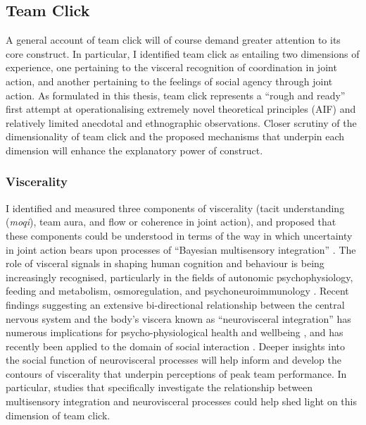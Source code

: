 

\subsection{Team Click}
A general account of team click will of course demand greater attention to its core construct.  In particular,  I identified team click as entailing two dimensions of experience, one pertaining to the visceral recognition of coordination in joint action, and another pertaining to the feelings of social agency through joint action. As formulated in this thesis, team click represents a ``rough and ready'' first attempt at operationalising extremely novel theoretical principles (AIF) and relatively limited anecdotal and ethnographic observations. Closer scrutiny of the dimensionality of team click and the proposed mechanisms that underpin each dimension will enhance the explanatory power of construct.

\subsubsection{Viscerality}
I identified and measured three components of viscerality (tacit understanding (\textit{moqi}), team aura, and flow or coherence in joint action), and proposed that these components could be understood in terms of the way in which uncertainty in joint action bears upon processes of ``Bayesian multisensory integration'' \citep{Ernst2004}.
The role of visceral signals in shaping human cognition and behaviour is being increasingly recognised, particularly in the fields of autonomic psychophysiology, feeding and metabolism, osmoregulation, and psychoneuroimmunology \citep[see:][]{Crtichely2015}.  Recent findings suggesting an extensive bi-directional relationship between the central nervous system and the body's viscera known as ``neurovisceral integration'' \citep[the gut-brain axis; see][]{Carabotti2015} has numerous implications for psycho-physiological health and wellbeing \citep{Porges2009}, and has recently been applied to the domain of social interaction \citep[see:][]{Porges2001,VanKleef2008,Akinola2014}.  Deeper insights into the social function of neurovisceral processes will help inform and develop the contours of viscerality that underpin perceptions of peak team performance.  In particular, studies that specifically investigate the relationship between multisensory integration and neurovisceral processes could help shed light on this dimension of team click.


